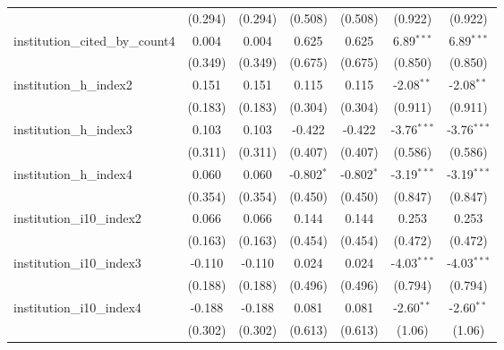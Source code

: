 \begin{tabular}{lcccccc}
                                         & (0.294)       & (0.294)       & (0.508)       & (0.508)       & (0.922)       & (0.922)\\   
   institution\_cited\_by\_count4        & 0.004         & 0.004         & 0.625         & 0.625         & 6.89$^{***}$  & 6.89$^{***}$\\   
                                         & (0.349)       & (0.349)       & (0.675)       & (0.675)       & (0.850)       & (0.850)\\   
   institution\_h\_index2                & 0.151         & 0.151         & 0.115         & 0.115         & -2.08$^{**}$  & -2.08$^{**}$\\   
                                         & (0.183)       & (0.183)       & (0.304)       & (0.304)       & (0.911)       & (0.911)\\   
   institution\_h\_index3                & 0.103         & 0.103         & -0.422        & -0.422        & -3.76$^{***}$ & -3.76$^{***}$\\   
                                         & (0.311)       & (0.311)       & (0.407)       & (0.407)       & (0.586)       & (0.586)\\   
   institution\_h\_index4                & 0.060         & 0.060         & -0.802$^{*}$  & -0.802$^{*}$  & -3.19$^{***}$ & -3.19$^{***}$\\   
                                         & (0.354)       & (0.354)       & (0.450)       & (0.450)       & (0.847)       & (0.847)\\   
   institution\_i10\_index2              & 0.066         & 0.066         & 0.144         & 0.144         & 0.253         & 0.253\\   
                                         & (0.163)       & (0.163)       & (0.454)       & (0.454)       & (0.472)       & (0.472)\\   
   institution\_i10\_index3              & -0.110        & -0.110        & 0.024         & 0.024         & -4.03$^{***}$ & -4.03$^{***}$\\   
                                         & (0.188)       & (0.188)       & (0.496)       & (0.496)       & (0.794)       & (0.794)\\   
   institution\_i10\_index4              & -0.188        & -0.188        & 0.081         & 0.081         & -2.60$^{**}$  & -2.60$^{**}$\\   
                                         & (0.302)       & (0.302)       & (0.613)       & (0.613)       & (1.06)        & (1.06)\\   

\end{tabular}
